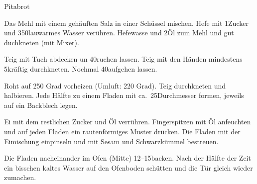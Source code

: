 \begin{recipe}{Pitabrot}

    \begin{ingredients}
    \end{ingredients}

    \begin{instructions}
        Das Mehl mit einem gehäuften \tl Salz in einer Schüssel mischen.
        Hefe mit 1\tl Zucker und 350\milliliter lauwarmes Wasser verühren.
        Hefewasse und 2\el Öl zum Mehl und gut duchkneten (mit Mixer).

        Teig mit Tuch abdecken un 40\minutes ruchen lassen.
        Teig mit den Händen mindestens 5\minutes kräftig durchkneten.
        Nochmal 40\minutes aufgehen lassen.

        Roht auf 250 Grad vorheizen (Umluft: 220 Grad).
        Teig durchkneten und halbieren.
        Jede Hälfte zu einem Fladen mit ca.\ 25\cm Durchmesser formen, jeweils auf ein Backblech legen.

        Ei mit dem restlichen Zucker und Öl verrühren.
        Fingerspitzen mit Öl anfeuchten und auf jeden Fladen ein rautenförmiges Muster drücken.
        Die Fladen mit der Eimischung einpinseln und mit Sesam und Schwarzkümmel bestreuen.

        Die Fladen nacheinander im Ofen (Mitte) 12--15\minutes backen.
        Nach der Hälfte der Zeit ein bisschen kaltes Wasser auf den Ofenboden schütten und die Tür gleich wieder zumachen.
    \end{instructions}
\end{recipe}
